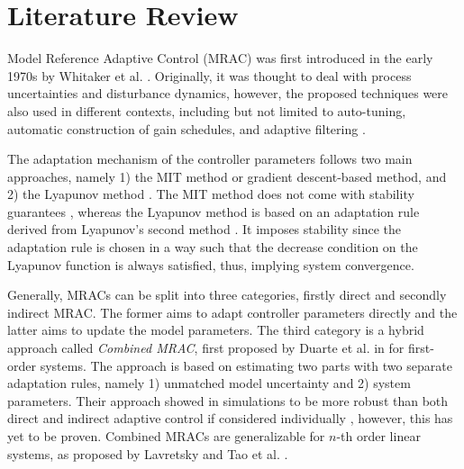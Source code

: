 \section{Literature Review}
Model Reference Adaptive Control (MRAC) was first introduced in the early 1970s by Whitaker et al. \cite{whitakerDesignModelReference1958}. Originally, it was thought to deal with process uncertainties and disturbance dynamics, however, the proposed techniques were also used in different contexts, including but not limited to auto-tuning, automatic construction of gain schedules, and adaptive filtering \cite{astromTheoryApplicationsAdaptive1983, astromHistoryAdaptiveControl2014}.

The adaptation mechanism of the controller parameters follows two main approaches, namely 1) the MIT method or gradient descent-based method, and 2) the Lyapunov method \cite{astromAdaptiveControl2008}. The MIT method does not come with stability guarantees \cite{mareelsRevisitingMitRule1987}, whereas the Lyapunov method is based on an adaptation rule derived from Lyapunov's second method \cite{shackclothSynthesisModelReference1965}. It imposes stability since the adaptation rule is chosen in a way such that the decrease condition on the Lyapunov function is always satisfied, thus, implying system convergence.

Generally, MRACs can be split into three categories, firstly direct and secondly indirect MRAC. The former aims to adapt controller parameters directly and the latter aims to update the model parameters. The third category is a hybrid approach called \textit{Combined MRAC}, first proposed by Duarte et al. in \cite{duarteCombinedDirectIndirect1989} for first-order systems. The approach is based on estimating two parts with two separate adaptation rules, namely 1) unmatched model uncertainty and 2) system parameters. Their approach showed in simulations to be more robust than both direct and indirect adaptive control if considered individually \cite{narendraRobustAdaptiveControl1988}, however, this has yet to be proven. Combined MRACs are generalizable for $n$-th order linear systems, as proposed by Lavretsky and Tao et al. \cite{lavretskyCombinedCompositeModel2009, taoAdaptiveControlSystems2013}.


